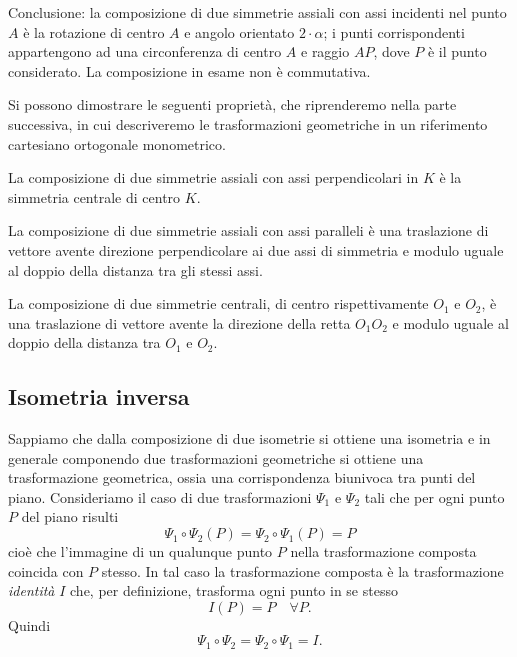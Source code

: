 Conclusione: la composizione di due simmetrie assiali con assi 
incidenti nel punto $A$ è la rotazione di centro $A$ e angolo 
orientato $2\cdot \alpha$; i punti corrispondenti appartengono ad una 
circonferenza di centro $A$ e raggio $AP$, dove $P$ è il punto 
considerato. La composizione in esame non è commutativa.

Si possono dimostrare le seguenti proprietà, che riprenderemo nella parte 
successiva, in cui descriveremo le trasformazioni geometriche in un riferimento 
cartesiano ortogonale monometrico.

\begin{proposizione}
La composizione di due simmetrie assiali con assi 
perpendicolari in $K$ è la simmetria centrale di centro $K$. 
\end{proposizione}

\begin{proposizione}
La composizione di due simmetrie assiali con assi paralleli è una 
traslazione di vettore avente direzione perpendicolare ai due assi di 
simmetria e modulo uguale al doppio della distanza tra gli stessi 
assi.
\end{proposizione}
      
\begin{proposizione}
La composizione di due simmetrie centrali, di centro rispettivamente 
$O_1$ e $O_2$, è una traslazione di vettore avente la direzione della 
retta $O_1O_2$ e modulo uguale al doppio della distanza tra $O_1$ e 
$O_2$.
\end{proposizione}
    
\subsection{Isometria inversa}
      
Sappiamo che dalla composizione di due isometrie si ottiene una 
isometria e in generale componendo due trasformazioni geometriche si 
ottiene una trasformazione geometrica, ossia una corrispondenza 
biunivoca tra punti del piano.
Consideriamo il caso di due trasformazioni $\Psi_1$ e $\Psi_2$ tali 
che per ogni punto $P$ del piano risulti
\[\Psi_1 \circ \Psi_2 (P) = \Psi_2 \circ \Psi_1 (P) = P\]
cioè che l'immagine di un qualunque punto $P$ nella trasformazione 
composta coincida con $P$ stesso. In tal caso la trasformazione 
composta è la trasformazione \emph{identità} $I$ che, per 
definizione, trasforma ogni punto in se stesso
\[I(P) = P\quad \forall P.\]
Quindi
\[\Psi_1 \circ \Psi_2 = \Psi_2 \circ \Psi_1 = I.\]

